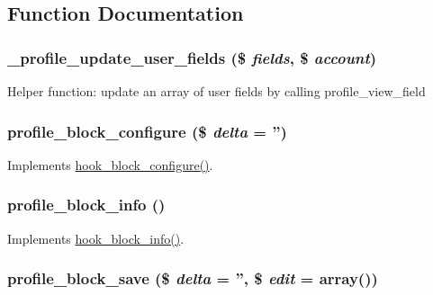 \subsection{Function Documentation}
\hypertarget{profile_8module_a7c8e6c9720f8fddbddb84ae746b448ec}{
\subsubsection[{\_\-profile\_\-update\_\-user\_\-fields}]{\setlength{\rightskip}{0pt plus 5cm}\_\-profile\_\-update\_\-user\_\-fields (\$ {\em fields}, \/  \$ {\em account})}}
\label{profile_8module_a7c8e6c9720f8fddbddb84ae746b448ec}
Helper function: update an array of user fields by calling profile\_\-view\_\-field \hypertarget{profile_8module_a26b6bb6662433ae41ee22b48f6f7ba13}{
\subsubsection[{profile\_\-block\_\-configure}]{\setlength{\rightskip}{0pt plus 5cm}profile\_\-block\_\-configure (\$ {\em delta} = {\ttfamily ''})}}
\label{profile_8module_a26b6bb6662433ae41ee22b48f6f7ba13}
Implements \hyperlink{group__hooks_gacc86fefd1e0299f387f79a37dd1a48b7}{hook\_\-block\_\-configure()}. \hypertarget{profile_8module_a99f72a059a33bba9a97302fa524775ff}{
\subsubsection[{profile\_\-block\_\-info}]{\setlength{\rightskip}{0pt plus 5cm}profile\_\-block\_\-info ()}}
\label{profile_8module_a99f72a059a33bba9a97302fa524775ff}
Implements \hyperlink{group__hooks_ga2bd926c3e90deeba0c3ba64fb3c64d73}{hook\_\-block\_\-info()}. \hypertarget{profile_8module_a245127a283b4afa8b603d759048aaf85}{
\subsubsection[{profile\_\-block\_\-save}]{\setlength{\rightskip}{0pt plus 5cm}profile\_\-block\_\-save (\$ {\em delta} = {\ttfamily ''}, \/  \$ {\em edit} = {\ttfamily array()})}}

